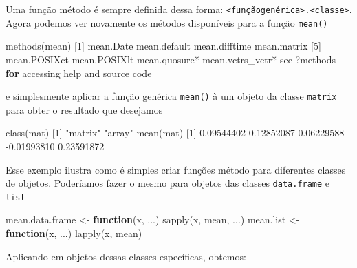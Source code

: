 \documentclass[
  10pt,
  a4paper]{book}
\newenvironment{Shaded}{\begin{snugshade}}{\end{snugshade}}
\newcommand{\ControlFlowTok}[1]{\textcolor[rgb]{0.13,0.29,0.53}{\textbf{#1}}}
\newcommand{\DecValTok}[1]{\textcolor[rgb]{0.00,0.00,0.81}{#1}}
\newcommand{\FloatTok}[1]{\textcolor[rgb]{0.00,0.00,0.81}{#1}}
\newcommand{\FunctionTok}[1]{\textcolor[rgb]{0.00,0.00,0.00}{#1}}
\newcommand{\NormalTok}[1]{#1}
\newcommand{\OtherTok}[1]{\textcolor[rgb]{0.56,0.35,0.01}{#1}}
\newcommand{\SpecialCharTok}[1]{\textcolor[rgb]{0.00,0.00,0.00}{#1}}
\newcommand{\StringTok}[1]{\textcolor[rgb]{0.31,0.60,0.02}{#1}}
\begin{document}
Uma função método é sempre definida dessa forma:
\texttt{\textless{}funçãogenérica\textgreater{}.\textless{}classe\textgreater{}}. Agora podemos ver novamente os métodos
disponíveis para a função \texttt{mean()}

\begin{Shaded}
\begin{Highlighting}[]
\FunctionTok{methods}\NormalTok{(mean)}
\NormalTok{[}\DecValTok{1}\NormalTok{] mean.Date        mean.default     mean.difftime    mean.matrix     }
\NormalTok{[}\DecValTok{5}\NormalTok{] mean.POSIXct     mean.POSIXlt     mean.quosure}\SpecialCharTok{*}\NormalTok{    mean.vctrs\_vctr}\SpecialCharTok{*}
\NormalTok{see }\StringTok{\textquotesingle{}?methods\textquotesingle{}} \ControlFlowTok{for}\NormalTok{ accessing help and source code}
\end{Highlighting}
\end{Shaded}

e simplesmente aplicar a função genérica \texttt{mean()} à um objeto da classe
\texttt{matrix} para obter o resultado que desejamos

\begin{Shaded}
\begin{Highlighting}[]
\FunctionTok{class}\NormalTok{(mat)}
\NormalTok{[}\DecValTok{1}\NormalTok{] }\StringTok{"matrix"} \StringTok{"array"} 
\FunctionTok{mean}\NormalTok{(mat)}
\NormalTok{[}\DecValTok{1}\NormalTok{]  }\FloatTok{0.09544402}  \FloatTok{0.12852087}  \FloatTok{0.06229588} \SpecialCharTok{{-}}\FloatTok{0.01993810}  \FloatTok{0.23591872}
\end{Highlighting}
\end{Shaded}

Esse exemplo ilustra como é simples criar funções método para
diferentes classes de objetos. Poderíamos fazer o mesmo para objetos das
classes \texttt{data.frame} e \texttt{list}

\begin{Shaded}
\begin{Highlighting}[]
\NormalTok{mean.data.frame }\OtherTok{\textless{}{-}} \ControlFlowTok{function}\NormalTok{(x, ...) }\FunctionTok{sapply}\NormalTok{(x, mean, ...)}
\NormalTok{mean.list }\OtherTok{\textless{}{-}} \ControlFlowTok{function}\NormalTok{(x, ...) }\FunctionTok{lapply}\NormalTok{(x, mean)}
\end{Highlighting}
\end{Shaded}

Aplicando em objetos dessas classes específicas, obtemos:
\end{document}

